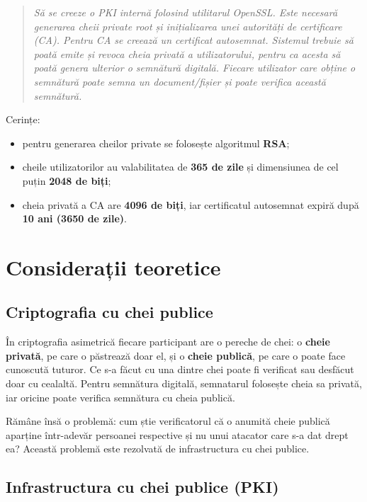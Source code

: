 \documentclass[12pt,a4paper]{article}
\begin{document}
\begin{quote}
\itshape
Să se creeze o PKI internă folosind utilitarul OpenSSL. Este necesară generarea
cheii private root și inițializarea unei autorități de certificare (CA). Pentru
CA se creează un certificat autosemnat. Sistemul trebuie să poată emite și
revoca cheia privată a utilizatorului, pentru ca acesta să poată genera ulterior
o semnătură digitală. Fiecare utilizator care obține o semnătură poate semna un
document/fișier și poate verifica această semnătură.
\end{quote}

Cerințe:
\begin{itemize}
    \item pentru generarea cheilor private se folosește algoritmul \textbf{RSA};
    \item cheile utilizatorilor au valabilitatea de \textbf{365 de zile} și
    dimensiunea de cel puțin \textbf{2048 de biți};
    \item cheia privată a CA are \textbf{4096 de biți}, iar certificatul
    autosemnat expiră după \textbf{10 ani (3650 de zile)}.
\end{itemize}

\section{Considerații teoretice}

\subsection{Criptografia cu chei publice}

În criptografia asimetrică fiecare participant are o pereche de chei: o
\textbf{cheie privată}, pe care o păstrează doar el, și o \textbf{cheie publică},
pe care o poate face cunoscută tuturor. Ce s-a făcut cu una dintre chei poate fi
verificat sau desfăcut doar cu cealaltă. Pentru semnătura digitală, semnatarul
folosește cheia sa privată, iar oricine poate verifica semnătura cu cheia
publică.

Rămâne însă o problemă: cum știe verificatorul că o anumită cheie publică
aparține într-adevăr persoanei respective și nu unui atacator care s-a dat drept
ea? Această problemă este rezolvată de infrastructura cu chei publice.

\subsection{Infrastructura cu chei publice (PKI)}
\end{document}
